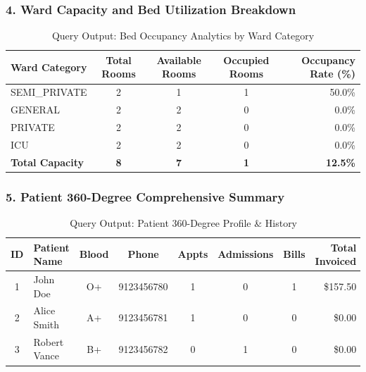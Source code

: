 \documentclass[12pt,a4paper]{article}
\begin{document}
\subsubsection{4. Ward Capacity and Bed Utilization Breakdown}
\begin{table}[H]
\centering
\small
\caption{Query Output: Bed Occupancy Analytics by Ward Category}
\vspace{0.15cm}
\begin{tabularx}{\textwidth}{|l|c|c|c|r|}
\hline
\textbf{Ward Category} & \textbf{Total Rooms} & \textbf{Available Rooms} & \textbf{Occupied Rooms} & \textbf{Occupancy Rate (\%)} \\
\hline
SEMI\_PRIVATE & 2 & 1 & 1 & 50.0\% \\
\hline
GENERAL       & 2 & 2 & 0 & 0.0\%  \\
\hline
PRIVATE       & 2 & 2 & 0 & 0.0\%  \\
\hline
ICU           & 2 & 2 & 0 & 0.0\%  \\
\hline
\textbf{Total Capacity} & \textbf{8} & \textbf{7} & \textbf{1} & \textbf{12.5\%} \\
\hline
\end{tabularx}
\end{table}

\subsubsection{5. Patient 360-Degree Comprehensive Summary}
\begin{table}[H]
\centering
\small
\caption{Query Output: Patient 360-Degree Profile \& History}
\vspace{0.15cm}
\begin{tabularx}{\textwidth}{|c|l|c|c|c|c|c|r|}
\hline
\textbf{ID} & \textbf{Patient Name} & \textbf{Blood} & \textbf{Phone} & \textbf{Appts} & \textbf{Admissions} & \textbf{Bills} & \textbf{Total Invoiced} \\
\hline
1 & John Doe     & O+ & 9123456780 & 1 & 0 & 1 & \$157.50 \\
\hline
2 & Alice Smith  & A+ & 9123456781 & 1 & 0 & 0 & \$0.00   \\
\hline
3 & Robert Vance & B+ & 9123456782 & 0 & 1 & 0 & \$0.00   \\
\hline
\end{tabularx}
\end{table}
\end{document}
